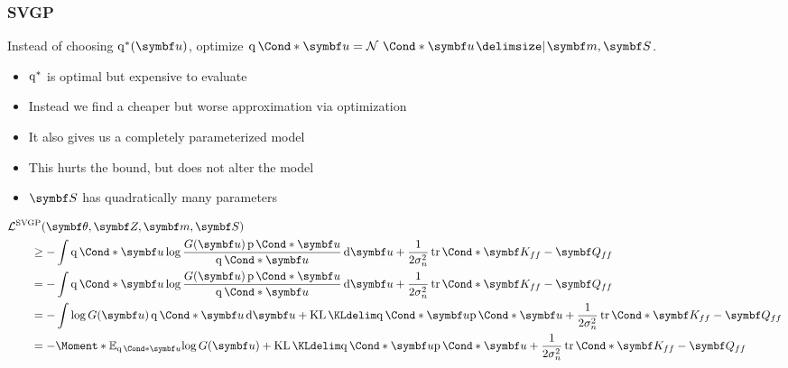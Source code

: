 \subsubsection{SVGP}
Instead of choosing $\q^\ast(\mat{u})$, optimize $\Variat*{\mat{u}} = \Gaussian*{\mat{u} \given \mat{m}, \mat{S}}$.
\begin{itemize}
    \item $\operatorname{q}^\ast$ is optimal but expensive to evaluate
    \item Instead we find a cheaper but worse approximation via optimization
    \item It also gives us a completely parameterized model
    \item This hurts the bound, but does not alter the model
    \item $\mat{S}$ has quadratically many parameters
\end{itemize}
\begin{align}
    \begin{split}
        \MoveEqLeft\Lc^{\text{SVGP}}(\mat{\theta}, \mat{Z}, \mat{m}, \mat{S}) \\
        &\geq -\int \Variat*{\mat{u}} \log\frac{G(\mat{u})\Prob*{\mat{u}}}{\Variat*{\mat{u}}} \diff \mat{u} + \frac{1}{2\sigma_n^2}\Fun*{\tr}{\mat{K_{ff}} - \mat{Q_{ff}}} \\
        &= -\int \Variat*{\mat{u}} \log\frac{G(\mat{u})\Prob*{\mat{u}}}{\Variat*{\mat{u}}} \diff \mat{u} + \frac{1}{2\sigma_n^2}\Fun*{\tr}{\mat{K_{ff}} - \mat{Q_{ff}}} \\
        &= -\int \log G(\mat{u}) \Variat*{\mat{u}} \diff \mat{u} + \KL{\Variat*{\mat{u}}}{\Prob*{\mat{u}}} + \frac{1}{2\sigma_n^2}\Fun*{\tr}{\mat{K_{ff}} - \mat{Q_{ff}}} \\
        &= -\Moment*{\E_{\Variat*{\mat{u}}}}{\log G(\mat{u})} + \KL{\Variat*{\mat{u}}}{\Prob*{\mat{u}}} + \frac{1}{2\sigma_n^2}\Fun*{\tr}{\mat{K_{ff}} - \mat{Q_{ff}}}
    \end{split}
\end{align}

